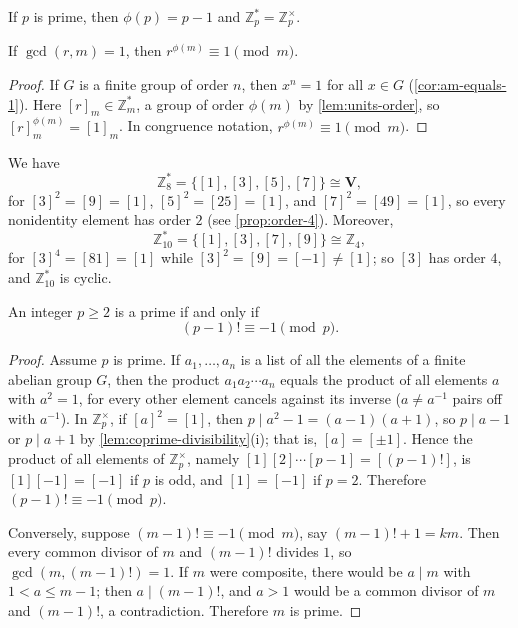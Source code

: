 If \(p\) is prime, then \(\phi(p) = p - 1\) and \(\mathbb Z_p^* = \mathbb Z_p^\times\).

\begin{theorem}[Euler]\label{thm:euler}
	If \(\gcd(r, m) = 1\), then \(r^{\phi(m)} \equiv 1 \pmod m\).
\end{theorem}

\begin{proof}
	If \(G\) is a finite group of order \(n\), then \(x^n = 1\) for all \(x \in G\)
	(\autoref{cor:am-equals-1}). Here \([r]_m \in \mathbb Z_m^*\), a group of order
	\(\phi(m)\) by \autoref{lem:units-order}, so \([r]_m^{\phi(m)} = [1]_m\). In congruence
	notation, \(r^{\phi(m)} \equiv 1 \pmod m\).
\end{proof}

\begin{eg}\label{eg:units-8-10}
	We have
	\[
		\mathbb Z_8^* = \{[1], [3], [5], [7]\} \cong \mathbf V,
	\]
	for \([3]^2 = [9] = [1]\), \([5]^2 = [25] = [1]\), and \([7]^2 = [49] = [1]\), so every
	nonidentity element has order \(2\) (see \autoref{prop:order-4}). Moreover,
	\[
		\mathbb Z_{10}^* = \{[1], [3], [7], [9]\} \cong \mathbb Z_4,
	\]
	for \([3]^4 = [81] = [1]\) while \([3]^2 = [9] = [-1] \neq [1]\); so \([3]\) has order
	\(4\), and \(\mathbb Z_{10}^*\) is cyclic.
\end{eg}

\begin{theorem}[Wilson]\label{thm:wilson}
	An integer \(p \geq 2\) is a prime if and only if
	\[
		(p-1)! \equiv -1 \pmod p.
	\]
\end{theorem}

\begin{proof}
	Assume \(p\) is prime. If \(a_1, \dots, a_n\) is a list of all the elements of a finite
	abelian group \(G\), then the product \(a_1a_2\cdots a_n\) equals the product of all
	elements \(a\) with \(a^2 = 1\), for every other element cancels against its inverse
	(\(a \neq a^{-1}\) pairs off with \(a^{-1}\)). In \(\mathbb Z_p^\times\), if
	\([a]^2 = [1]\), then \(p \mid a^2 - 1 = (a-1)(a+1)\), so \(p \mid a - 1\) or
	\(p \mid a + 1\) by \autoref{lem:coprime-divisibility}(i); that is, \([a] = [\pm 1]\).
	Hence the product of all elements of \(\mathbb Z_p^\times\), namely
	\([1][2]\cdots[p-1] = [(p-1)!]\), is \([1][-1] = [-1]\) if \(p\) is odd, and
	\([1] = [-1]\) if \(p = 2\). Therefore \((p-1)! \equiv -1 \pmod p\).

	Conversely, suppose \((m-1)! \equiv -1 \pmod m\), say \((m-1)! + 1 = km\). Then every
	common divisor of \(m\) and \((m-1)!\) divides \(1\), so \(\gcd(m, (m-1)!) = 1\). If
	\(m\) were composite, there would be \(a \mid m\) with \(1 < a \leq m-1\); then
	\(a \mid (m-1)!\), and \(a > 1\) would be a common divisor of \(m\) and \((m-1)!\), a
	contradiction. Therefore \(m\) is prime.
\end{proof}

